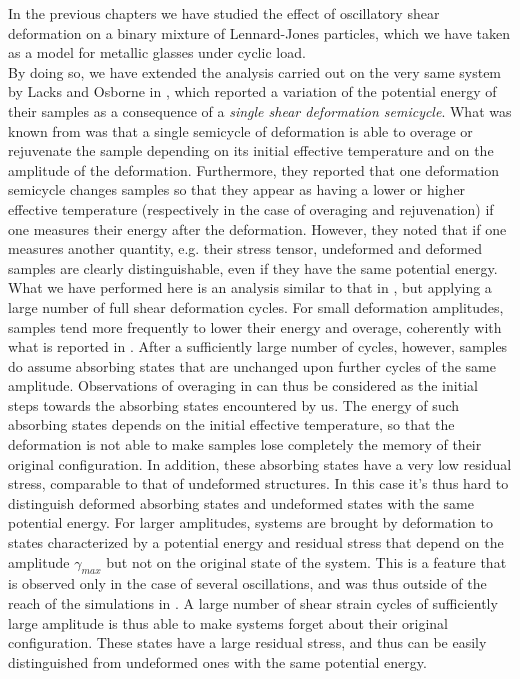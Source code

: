 In the previous chapters we have studied the effect of oscillatory shear deformation on a binary mixture of Lennard-Jones particles, which we have taken as a model for metallic glasses under cyclic load. \\
By doing so, we have extended the analysis carried out on the very same system by Lacks and Osborne in \cite{lacks2004energy}, which reported a variation of the potential energy of their samples as a consequence of a \emph{single shear deformation semicycle}.
What was known from \cite{lacks2004energy} was that a single semicycle of deformation is able to overage or rejuvenate the sample depending on its initial effective temperature and on the amplitude of the deformation. Furthermore, they reported that one deformation semicycle changes samples so that they appear as having a lower or higher effective temperature (respectively in the case of overaging and rejuvenation) if one measures their energy after the deformation. However, they noted that if one measures another quantity, e.g. their stress tensor, undeformed and deformed samples are clearly distinguishable, even if they have the same potential energy. \\
What we have performed here is an analysis similar to that in \cite{lacks2004energy}, but applying a large number of full shear deformation cycles. For small deformation amplitudes, samples tend more frequently to lower their energy and overage, coherently with what is reported in \cite{lacks2004energy}. After a sufficiently large number of cycles, however, samples do assume absorbing states that are unchanged upon further cycles of the same amplitude. Observations of overaging in \cite{lacks2004energy} can thus be considered as the initial steps towards the absorbing states encountered by us. The energy of such absorbing states depends on the initial effective temperature, so that the deformation is not able to make samples lose completely the memory of their original configuration. In addition, these absorbing states have a very low residual stress, comparable to that of undeformed structures. In this case it's thus hard to distinguish deformed absorbing states and undeformed states with the same potential energy.
For larger amplitudes, systems are brought by deformation to states characterized by a potential energy and residual stress that depend on the amplitude $\gamma_{max}$ but not on the original state of the system. This is a feature that is observed only in the case of several oscillations, and was thus outside of the reach of the simulations in \cite{lacks2004energy}. A large number of shear strain cycles of sufficiently large amplitude is thus able to make systems forget about their original configuration. These states have a large residual stress, and thus can be easily distinguished from undeformed ones with the same potential energy.\\
